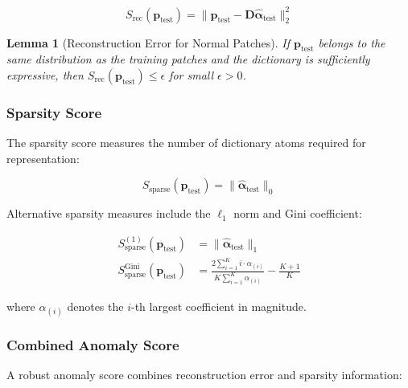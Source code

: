 \documentclass[12pt]{article}
\newcommand{\dictionary}{\mathbf{D}}
\newcommand{\patch}{\mathbf{p}}
\newcommand{\coeff}{\boldsymbol{\alpha}}
\newtheorem{lemma}[theorem]{Lemma}
\begin{document}
\begin{equation}
    \label{eq:reconstruction_error}
    S_{\text{rec}}(\patch_{\text{test}}) = \|\patch_{\text{test}} - \dictionary\hat{\coeff}_{\text{test}}\|_2^2
\end{equation}

\begin{lemma}[Reconstruction Error for Normal Patches]
    \label{lem:normal_reconstruction}
    If $\patch_{\text{test}}$ belongs to the same distribution as the training patches and the dictionary is sufficiently expressive, then $S_{\text{rec}}(\patch_{\text{test}}) \leq \epsilon$ for small $\epsilon > 0$.
\end{lemma}

\subsubsection{Sparsity Score}
\label{subsubsec:sparsity_score}

The sparsity score measures the number of dictionary atoms required for representation:

\begin{equation}
    \label{eq:sparsity_score}
    S_{\text{sparse}}(\patch_{\text{test}}) = \|\hat{\coeff}_{\text{test}}\|_0
\end{equation}

Alternative sparsity measures include the $\ell_1$ norm and Gini coefficient:

\begin{align}
    S_{\text{sparse}}^{(1)}(\patch_{\text{test}})         & = \|\hat{\coeff}_{\text{test}}\|_1 \label{eq:l1_sparsity}                                                        \\
    S_{\text{sparse}}^{\text{Gini}}(\patch_{\text{test}}) & = \frac{2\sum_{i=1}^K i \cdot \alpha_{(i)}}{K\sum_{i=1}^K \alpha_{(i)}} - \frac{K+1}{K} \label{eq:gini_sparsity}
\end{align}

where $\alpha_{(i)}$ denotes the $i$-th largest coefficient in magnitude.

\subsubsection{Combined Anomaly Score}
\label{subsubsec:combined_score}

A robust anomaly score combines reconstruction error and sparsity information:
\end{document}
